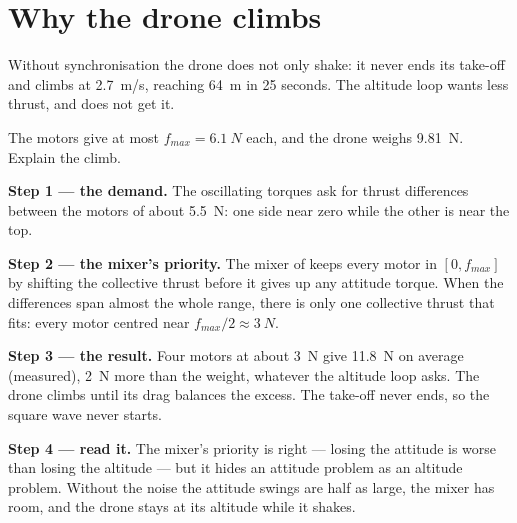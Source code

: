 \section{Why the drone climbs}

Without synchronisation the drone does not only shake: it never ends its take-off and climbs at \SI{2.7}{m/s}, reaching \SI{64}{m} in 25 seconds. The altitude loop wants less thrust, and does not get it.

\begin{example}
\label{ex:indisync-climb}
The motors give at most $f_{max} = \SI{6.1}{N}$ each, and the drone weighs \SI{9.81}{N}. Explain the climb.

\textbf{Step 1 — the demand.} The oscillating torques ask for thrust differences between the motors of about \SI{5.5}{N}: one side near zero while the other is near the top.

\textbf{Step 2 — the mixer's priority.} The mixer of  keeps every motor in $[0, f_{max}]$ by shifting the collective thrust before it gives up any attitude torque. When the differences span almost the whole range, there is only one collective thrust that fits: every motor centred near $f_{max}/2 \approx \SI{3}{N}$.

\textbf{Step 3 — the result.} Four motors at about \SI{3}{N} give \SI{11.8}{N} on average (measured), \SI{2}{N} more than the weight, whatever the altitude loop asks. The drone climbs until its drag balances the excess. The take-off never ends, so the square wave never starts.

\textbf{Step 4 — read it.} The mixer's priority is right — losing the attitude is worse than losing the altitude — but it hides an attitude problem as an altitude problem. Without the noise the attitude swings are half as large, the mixer has room, and the drone stays at its altitude while it shakes.
\end{example}


